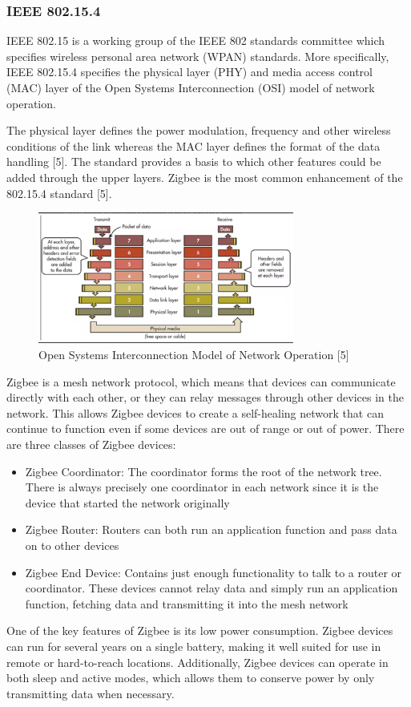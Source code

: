 \documentclass[12pt, a4paper]{article}
\begin{document}
\subsubsection{IEEE 802.15.4}
IEEE 802.15 is a working group of the IEEE 802 standards committee which specifies wireless personal area network (WPAN) standards. More specifically, IEEE 802.15.4 specifies the physical layer (PHY) and media access control (MAC) layer of the Open Systems Interconnection (OSI) model of network operation.

The physical layer defines the power modulation, frequency and other wireless conditions of the link whereas the MAC layer defines the format of the data handling [5]. The standard provides a basis to which other features could be added through the upper layers. Zigbee is the most common enhancement of the 802.15.4 standard [5]. 
\begin{figure}[h]
    \centering
    \includegraphics[width=0.75\textwidth]{osi model.png}
    \caption{Open Systems Interconnection Model of Network Operation [5]}
    \label{fig:osi_model}
\end{figure}
\newline
Zigbee is a mesh network protocol, which means that devices can communicate directly with each other, or they can relay messages through other devices in the network. This allows Zigbee devices to create a self-healing network that can continue to function even if some devices are out of range or out of power. There are three classes of Zigbee devices:
\begin{itemize}
    \item Zigbee Coordinator: The coordinator forms the root of the network tree. There is always precisely one coordinator in each network since it is the device that started the network originally
    \item Zigbee Router: Routers can both run an application function and pass data on to other devices
    \item Zigbee End Device: Contains just enough functionality to talk to a router or coordinator. These devices cannot relay data and simply run an application function, fetching data and transmitting it into the mesh network
\end{itemize}
One of the key features of Zigbee is its low power consumption. Zigbee devices can run for several years on a single battery, 
making it well suited for use in remote or hard-to-reach locations. Additionally, Zigbee devices can operate in both sleep and 
active modes, which allows them to conserve power by only transmitting data when necessary.
\end{document}
